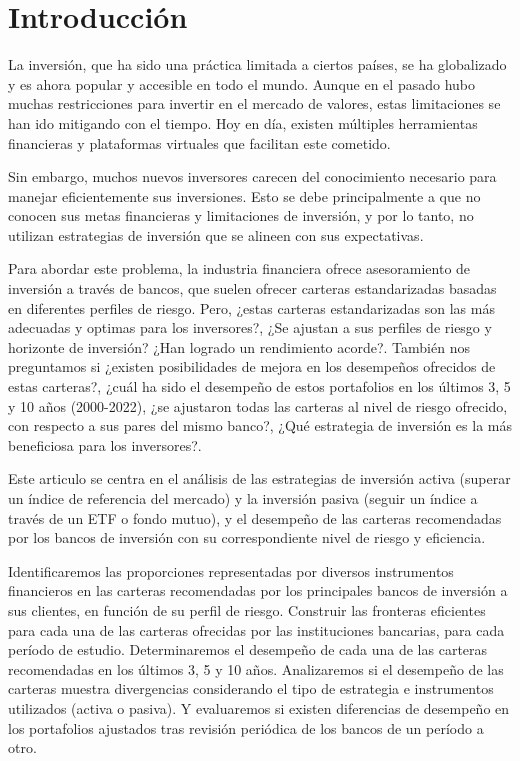 \documentclass[a4paper,fleqn]{cas-sc}
\begin{document}


\section{Introducción}

La inversión, que ha sido una práctica limitada a ciertos países, se ha globalizado y es ahora popular y accesible en todo el mundo. Aunque en el pasado hubo muchas restricciones para invertir en el mercado de valores, estas limitaciones se han ido mitigando con el tiempo. Hoy en día, existen múltiples herramientas financieras y plataformas virtuales que facilitan este cometido.

Sin embargo, muchos nuevos inversores carecen del conocimiento necesario para manejar eficientemente sus inversiones. Esto se debe principalmente a que no conocen sus metas financieras y limitaciones de inversión, y por lo tanto, no utilizan estrategias de inversión que se alineen con sus expectativas.

Para abordar este problema, la industria financiera ofrece asesoramiento de inversión a través de bancos, que suelen ofrecer carteras estandarizadas basadas en diferentes perfiles de riesgo. Pero, ¿estas carteras estandarizadas son las más adecuadas y optimas para los inversores?, ¿Se ajustan a sus perfiles de riesgo y horizonte de inversión? ¿Han logrado un rendimiento acorde?. También nos preguntamos si ¿existen posibilidades de mejora en los desempeños ofrecidos de estas carteras?, ¿cuál ha sido el desempeño de estos portafolios en los últimos 3, 5 y 10 años (2000-2022), ¿se ajustaron todas las carteras al nivel de riesgo ofrecido, con respecto a sus pares del mismo banco?, ¿Qué estrategia de inversión es la más beneficiosa para los inversores?.

Este articulo se centra en el análisis de las estrategias de inversión activa (superar un índice de referencia del mercado) y la inversión pasiva (seguir un índice a través de un ETF o fondo mutuo), y el desempeño de las carteras recomendadas por los bancos de inversión con su correspondiente nivel de riesgo y eficiencia. 

Identificaremos las proporciones representadas por diversos instrumentos financieros en las carteras recomendadas por los principales bancos de inversión a sus clientes, en función de su perfil de riesgo. Construir las fronteras eficientes para cada una de las carteras ofrecidas por las instituciones bancarias, para cada período de estudio. Determinaremos el desempeño de cada una de las carteras recomendadas en los últimos 3, 5 y 10 años. Analizaremos si el desempeño de las carteras muestra divergencias considerando el tipo de estrategia e instrumentos utilizados (activa o pasiva). Y evaluaremos si existen diferencias de desempeño en los portafolios ajustados tras revisión periódica de los bancos de un período a otro.
\end{document}
